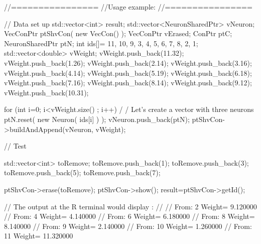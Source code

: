 \begin{DoxyCode}
        //================
        //Usage example:
        //================

        // Data set up
                        std::vector<int> result;
                        std::vector<NeuronSharedPtr> vNeuron;
                        VecConPtr ptShvCon( new VecCon() );
                        VecConPtr vErased;
                        ConPtr    ptC;
                        NeuronSharedPtr ptN;
                        int ids[]= {11, 10, 9, 3, 4, 5, 6, 7, 8, 2, 1};
                        std::vector<double> vWeight;
                        vWeight.push_back(11.32);
                        vWeight.push_back(1.26);
                        vWeight.push_back(2.14);
                        vWeight.push_back(3.16);
                        vWeight.push_back(4.14);
                        vWeight.push_back(5.19);
                        vWeight.push_back(6.18);
                        vWeight.push_back(7.16);
                        vWeight.push_back(8.14);
                        vWeight.push_back(9.12);
                        vWeight.push_back(10.31);

                        for (int i=0; i<vWeight.size() ; i++) {                         /
      / Let's create a vector with three neurons
                                ptN.reset( new Neuron( ids[i] ) );
                                vNeuron.push_back(ptN);
                        }
                        ptShvCon->buildAndAppend(vNeuron, vWeight);

                        // Test

                        std::vector<int> toRemove;
                        toRemove.push_back(1);
                        toRemove.push_back(3);
                        toRemove.push_back(5);
                        toRemove.push_back(7);

                        ptShvCon->erase(toRemove);
                        ptShvCon->show();
                        result=ptShvCon->getId();

                // The output at the R terminal would display :
                //
                // From:         2       Weight=         9.120000
                // From:         4       Weight=         4.140000
                // From:         6       Weight=         6.180000
                // From:         8       Weight=         8.140000
                // From:         9       Weight=         2.140000
                // From:         10  Weight=     1.260000
                // From:         11  Weight=     11.320000
\end{DoxyCode}



